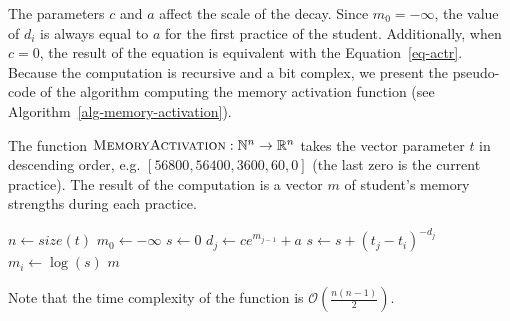 The parameters $c$ and $a$ affect the scale of the decay. Since $m_0 = -\infty$, the value of $d_i$ is always equal to $a$ for the first practice of the student. Additionally, when $c = 0$, the result of the equation is equivalent with the Equation~\ref{eq-actr}. Because the computation is recursive and a bit complex, we present the pseudo-code of the algorithm computing the memory activation function (see Algorithm~\ref{alg-memory-activation}).

\begin{algorithm}
  \caption{The function $\textsc{MemoryActivation}: \mathbb{N}^n \rightarrow \mathbb{R}^n$ takes the vector parameter $t$ in descending order, e.g. $[56800, 56400, 3600, 60, 0]$ (the last zero is the current practice). The result of the computation is a vector $m$ of student's memory strengths during each practice.}
  \label{alg-memory-activation}
  \begin{algorithmic}[1]
      \State $n \gets size(t)$
      \State $m_0 \gets -\infty$
        \State $s \gets 0$
          \State $d_j \gets ce^{m_{j-1}} + a$
          \State $s \gets s + (t_j - t_i)^{-d_j}$
        \EndFor
        \State $m_i \gets \log(s)$
      \EndFor
      \State \Return $m$
    \EndFunction
  \end{algorithmic}
\end{algorithm}


Note that the time complexity of the function is $\mathcal{O}\left(\frac{n(n-1)}{2}\right)$.
